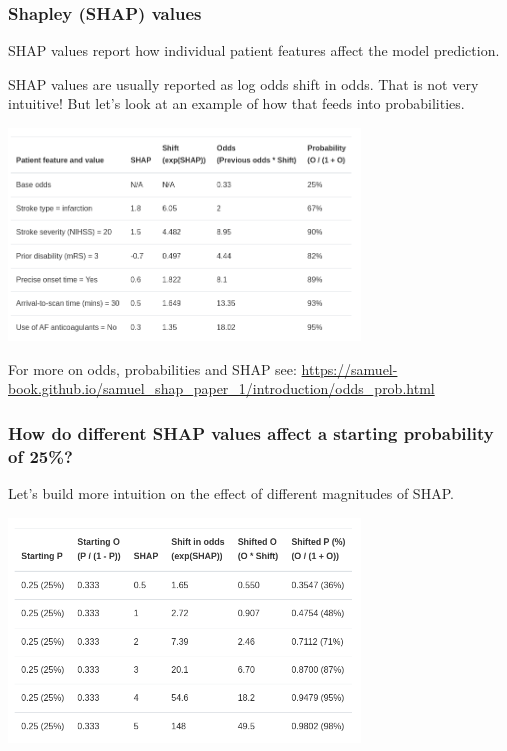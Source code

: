 \documentclass[xcolor={usenames,dvipsnames}]{beamer}
\newcommand{\smallurl}[1]{\textcolor{blue}{\fontsize{4pt}{4.8pt}\selectfont \url{#1}}}
\begin{document}
\begin{frame}
\frametitle{Shapley (SHAP) values}

{\footnotesize
SHAP values report how individual patient features affect the model prediction. 
\vspace{0.5em}

SHAP values are usually reported as log odds shift in odds. That is not very intuitive! 
But let’s look at an example of how that feeds into probabilities.
} 

\begin{center} 
\includegraphics[width=0.7\textwidth]{./images/SHAP_values_table}
\end{center} 

{\tiny For more on odds, probabilities and SHAP see: }
\smallurl{https://samuel-book.github.io/samuel_shap_paper_1/introduction/odds_prob.html}

\end{frame}





\begin{frame}
\frametitle{How do different SHAP values affect a starting probability of 25\%?}

Let’s build more intuition on the effect of different magnitudes of SHAP.

\begin{center}
\includegraphics[width=0.7\textwidth]{./images/shap_affect_probability}
\end{center} 

\end{frame}
\end{document}
